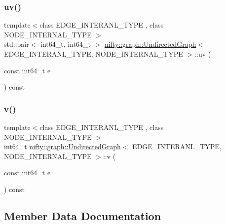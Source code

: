 \subsubsection{\texorpdfstring{uv()}{uv()}}
{\footnotesize\ttfamily template$<$class E\+D\+G\+E\+\_\+\+I\+N\+T\+E\+R\+A\+N\+L\+\_\+\+T\+Y\+PE , class N\+O\+D\+E\+\_\+\+I\+N\+T\+E\+R\+N\+A\+L\+\_\+\+T\+Y\+PE $>$ \\
std\+::pair$<$ int64\+\_\+t, int64\+\_\+t $>$ \hyperlink{classnifty_1_1graph_1_1UndirectedGraph}{nifty\+::graph\+::\+Undirected\+Graph}$<$ E\+D\+G\+E\+\_\+\+I\+N\+T\+E\+R\+A\+N\+L\+\_\+\+T\+Y\+PE, N\+O\+D\+E\+\_\+\+I\+N\+T\+E\+R\+N\+A\+L\+\_\+\+T\+Y\+PE $>$\+::uv (\begin{DoxyParamCaption}\item[{const int64\+\_\+t}]{e }\end{DoxyParamCaption}) const}

\mbox{\label{classnifty_1_1graph_1_1UndirectedGraph_af5f8ff3cf680e86d0fc2eb4a40cd7e45}} 
\subsubsection{\texorpdfstring{v()}{v()}}
{\footnotesize\ttfamily template$<$class E\+D\+G\+E\+\_\+\+I\+N\+T\+E\+R\+A\+N\+L\+\_\+\+T\+Y\+PE , class N\+O\+D\+E\+\_\+\+I\+N\+T\+E\+R\+N\+A\+L\+\_\+\+T\+Y\+PE $>$ \\
int64\+\_\+t \hyperlink{classnifty_1_1graph_1_1UndirectedGraph}{nifty\+::graph\+::\+Undirected\+Graph}$<$ E\+D\+G\+E\+\_\+\+I\+N\+T\+E\+R\+A\+N\+L\+\_\+\+T\+Y\+PE, N\+O\+D\+E\+\_\+\+I\+N\+T\+E\+R\+N\+A\+L\+\_\+\+T\+Y\+PE $>$\+::v (\begin{DoxyParamCaption}\item[{const int64\+\_\+t}]{e }\end{DoxyParamCaption}) const}



\subsection{Member Data Documentation}
\mbox{\label{classnifty_1_1graph_1_1UndirectedGraph_adc3e4d3dc0f8bff661042af2a05d342f}} 
